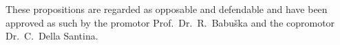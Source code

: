 \documentclass{propositions}
\begin{document}

\begin{center}
These propositions are regarded as opposable and defendable and have been approved as such by the promotor Prof.\ Dr.\ R.\ Babu\v{s}ka and the copromotor Dr.\ C.\ Della Santina.
\end{center}




















\end{document}
